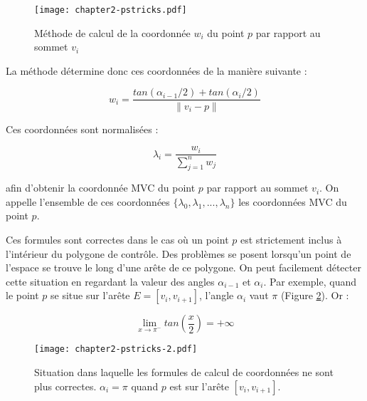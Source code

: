 \begin{figure}[ht]
  \begin{center}
    \texttt{[image: chapter2-pstricks.pdf]}
    \caption[Méthode de calcul MVC]{Méthode de calcul de la coordonnée $w_i$ du point $p$ par rapport
    au sommet $v_i$}
    \label{DEFcal}
  \end{center}
\end{figure}

La méthode détermine donc ces coordonnées de la manière suivante :

\begin{equation}
  w_i = \frac{tan(\alpha_{i-1}/2) + tan(\alpha_i/2)}{\| v_i - p \|}
  \label{DEFcoo}
\end{equation}

Ces coordonnées sont normalisées :

\begin{equation}
  \lambda_i = \frac{w_i}{\sum_{j=1}^n w_j}
\end{equation}

afin d'obtenir la coordonnée MVC du point $p$ par rapport au sommet $v_i$. On
appelle l'ensemble de ces coordonnées $\{\lambda_0, \lambda_1, ...,
\lambda_n\}$ les coordonnées MVC du point $p$.

Ces formules sont correctes dans le cas où un point $p$ est strictement inclus
à l'intérieur du polygone de contrôle. Des problèmes se posent lorsqu'un point
de l'espace se trouve le long d'une arête de ce polygone. On peut facilement
détecter cette situation en regardant la valeur des angles $\alpha_{i-1}$ et
$\alpha_i$. Par exemple, quand le point $p$ se situe sur l'arête $E =
[v_i,v_{i+1}]$, l'angle $\alpha_i$ vaut $\pi$ (Figure \ref{DEFinc}). Or :

\begin{displaymath}
  \lim\limits_{x \to \pi^-} tan(\frac{x}{2}) = +\infty
\end{displaymath}

\begin{figure}[ht]
  \begin{center}
    \texttt{[image: chapter2-pstricks-2.pdf]}

    \caption[Calcul de coordonnées incorrect] {Situation dans laquelle les
formules de calcul de coordonnées ne sont plus correctes. $\alpha_i = \pi$
quand $p$ est sur l'arête $[v_i,v_{i+1}]$.}

    \label{DEFinc}
  \end{center}
\end{figure}

